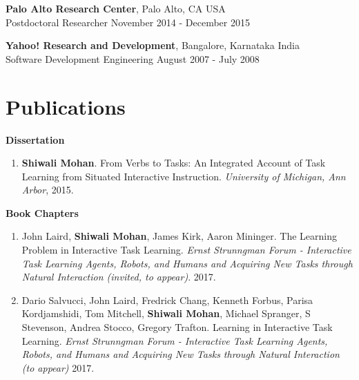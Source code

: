 \documentclass[margin,line,11pt]{res}
\begin{document}
\begin{resume}
          {\bf Palo Alto Research Center}, Palo Alto, CA USA \\
          {Postdoctoral Researcher} \hfill November 2014 - December 2015 
                  
          {\bf Yahoo! Research and Development}, Bangalore, Karnataka India \\
          {Software Development Engineering} \hfill August 2007 - July 2008

\section{\sc Publications}
\textbf{Dissertation}
\begin{enumerate}[label=\lbrack D\arabic*\rbrack, leftmargin=*]
\item \textbf{Shiwali Mohan}.  From Verbs to Tasks: An Integrated Account of Task Learning from Situated Interactive Instruction. \emph{University of Michigan, Ann Arbor}, 2015.
\end{enumerate}

\textbf{Book Chapters}
\begin{enumerate}[label=\lbrack B\arabic*\rbrack, leftmargin=*]
\item John Laird, \textbf{Shiwali Mohan}, James Kirk, Aaron Mininger. The Learning Problem in Interactive Task Learning. \emph{Ernst Strunngman Forum - Interactive Task Learning  Agents, Robots, and Humans and Acquiring New Tasks through Natural Interaction (invited, to appear)}. 2017.
  \item Dario Salvucci, John Laird, Fredrick Chang, Kenneth Forbus, Parisa Kordjamshidi, Tom Mitchell, \textbf{Shiwali Mohan}, Michael Spranger, S Stevenson, Andrea Stocco, Gregory Trafton. Learning in Interactive Task Learning. \emph{Ernst Strunngman Forum - Interactive Task Learning  Agents, Robots, and Humans and Acquiring New Tasks through Natural Interaction (to appear)} 2017. 
  \end{enumerate}


\end{resume}
\end{document}
